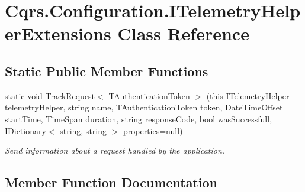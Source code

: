 \hypertarget{classCqrs_1_1Configuration_1_1ITelemetryHelperExtensions}{}\section{Cqrs.\+Configuration.\+I\+Telemetry\+Helper\+Extensions Class Reference}
\label{classCqrs_1_1Configuration_1_1ITelemetryHelperExtensions}
\subsection*{Static Public Member Functions}
\begin{DoxyCompactItemize}
\item 
static void \hyperlink{classCqrs_1_1Configuration_1_1ITelemetryHelperExtensions_a2e4bf3f56dbd0d10acac587499aca7ba_a2e4bf3f56dbd0d10acac587499aca7ba}{Track\+Request$<$ T\+Authentication\+Token $>$} (this I\+Telemetry\+Helper telemetry\+Helper, string name, T\+Authentication\+Token token, Date\+Time\+Offset start\+Time, Time\+Span duration, string response\+Code, bool was\+Successfull, I\+Dictionary$<$ string, string $>$ properties=null)
\begin{DoxyCompactList}\small\item\em Send information about a request handled by the application. \end{DoxyCompactList}\end{DoxyCompactItemize}


\subsection{Member Function Documentation}
\mbox{\label{classCqrs_1_1Configuration_1_1ITelemetryHelperExtensions_a2e4bf3f56dbd0d10acac587499aca7ba_a2e4bf3f56dbd0d10acac587499aca7ba}} 
